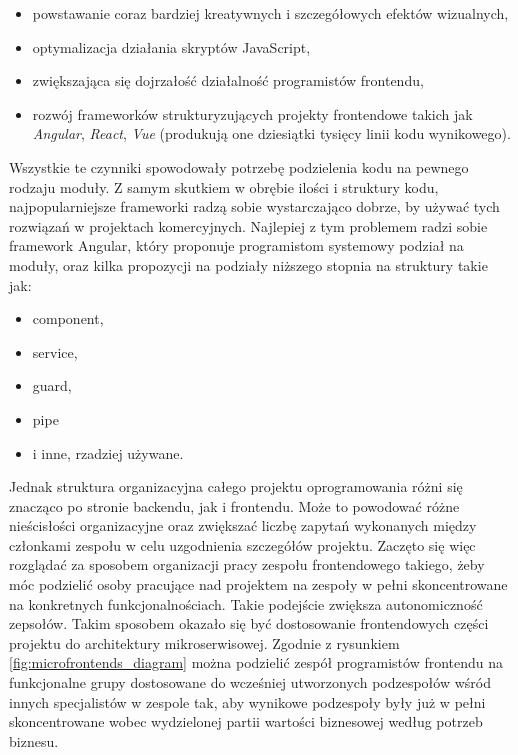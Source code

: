 \documentclass{SGGW-thesis}
\begin{document}
  \begin{itemize}
    \item powstawanie coraz bardziej kreatywnych i szczegółowych efektów wizualnych,
    \item optymalizacja działania skryptów JavaScript,
    \item zwiększająca się dojrzałość działalność programistów frontendu,
    \item rozwój frameworków strukturyzujących projekty frontendowe takich jak \textit{Angular}, \textit{React}, \textit{Vue} (produkują one dziesiątki tysięcy linii kodu wynikowego).
  \end{itemize}

  Wszystkie te czynniki spowodowały potrzebę podzielenia kodu na pewnego rodzaju moduły. Z samym skutkiem w obrębie ilości i struktury kodu, najpopularniejsze frameworki radzą sobie wystarczająco dobrze, by używać tych rozwiązań w projektach komercyjnych. Najlepiej z tym problemem radzi sobie framework Angular, który proponuje programistom systemowy podział na moduły, oraz kilka propozycji na podziały niższego stopnia na struktury takie jak:
  
  \begin{itemize}
    \item component,
    \item service,
    \item guard,
    \item pipe
    \item i inne, rzadziej używane.
  \end{itemize}

  Jednak struktura organizacyjna całego projektu oprogramowania różni się znacząco po stronie backendu, jak i frontendu. Może to powodować różne nieścisłości organizacyjne oraz zwiększać liczbę zapytań wykonanych między członkami zespołu w celu uzgodnienia szczegółów projektu. Zaczęto się więc rozglądać za sposobem organizacji pracy zespołu frontendowego takiego, żeby móc podzielić osoby pracujące nad projektem na zespoły w pełni skoncentrowane na konkretnych funkcjonalnościach. Takie podejście zwiększa autonomiczność zepsołów.
  Takim sposobem okazało się być dostosowanie frontendowych części projektu do architektury mikroserwisowej. Zgodnie z rysunkiem \cref{fig:microfrontends_diagram} można podzielić zespół programistów frontendu na funkcjonalne grupy dostosowane do wcześniej utworzonych podzespołów wśród innych specjalistów w zespole tak, aby wynikowe podzespoły były już w pełni skoncentrowane wobec wydzielonej partii wartości biznesowej według potrzeb biznesu. 
  
\end{document}
